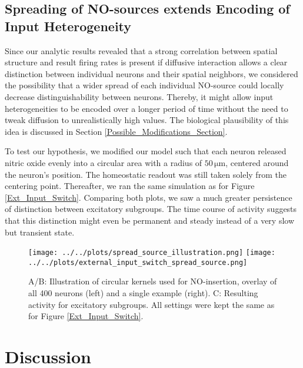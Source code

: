 \documentclass[10pt,a4paper]{article}
\begin{document}
\newpage
\subsection{Spreading of NO-sources extends Encoding of Input Heterogeneity}
Since our analytic results revealed that a strong correlation between spatial structure and result firing rates is present if diffusive interaction allows a clear distinction between individual neurons and their spatial neighbors, we considered the possibility that a wider spread of each individual NO-source could locally decrease distinguishability between neurons. Thereby, it might allow input heterogeneities to be encoded over a longer period of time without the need to tweak diffusion to unrealistically high values. The biological plausibility of this idea is discussed in Section \ref{Possible_Modifications_Section}.

To test our hypothesis, we modified our model such that each neuron released nitric oxide evenly into a circular area with a radius of $\mathrm{50 \, \mu m}$, centered around the neuron's position. The homeostatic readout was still taken solely from the centering point. Thereafter, we ran the same simulation as for Figure \ref{Ext_Input_Switch}. Comparing both plots, we saw a much greater persistence of distinction between excitatory subgroups. The time course of activity suggests that this distinction might even be permanent and steady instead of a very slow but transient state.
\begin{figure}
\texttt{[image: ../../plots/spread\_source\_illustration.png]}
\texttt{[image: ../../plots/external\_input\_switch\_spread\_source.png]}
\caption{A/B: Illustration of circular kernels used for NO-insertion, overlay of all 400 neurons (left) and a single example (right). C: Resulting activity for excitatory subgroups. All settings were kept the same as for Figure \ref{Ext_Input_Switch}.}
\label{External_Input_Switch_Spread_Source}
\end{figure}


\section{Discussion}
\end{document}

